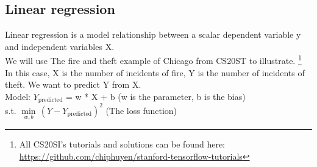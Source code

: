 \documentclass{article}
\begin{document}
		\subsection{Linear regression}
		Linear regression is a model relationship between a scalar dependent variable y and independent variables X.\\
		We will use The fire and theft example of Chicago from CS20ST to illustrate. \footnote{All CS20SI's tutorials and solutions can be found here: \url{https://github.com/chiphuyen/stanford-tensorflow-tutorials}}\\
		In this case, X is the number of incidents of fire, Y is the number of incidents of theft. We want to predict Y from X.\\
		Model: $Y_{\text{predicted}}$ = w * X + b (w is the parameter, b is the bias)\\
		\indent s.t. $ \underset{w,b}\min \,(Y - Y_{\text{predicted}})^{2}$ (The loss function)\\
\end{document}
